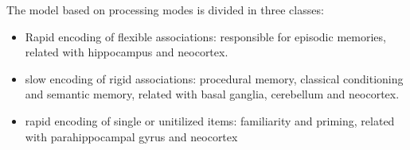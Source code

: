 \documentclass[12pt,article,oneside,a4paper]{memoir}
\begin{document}
\begin{enumerate}
The model based on processing modes is divided in three classes:
\begin{itemize}
\item Rapid encoding of flexible associations: responsible for episodic
memories, related with hippocampus and neocortex.
\item slow encoding of rigid associations: procedural memory, classical
conditioning and semantic memory, related with basal ganglia, cerebellum and
neocortex.
\item rapid encoding of single or unitilized items: familiarity and priming,
related with parahippocampal gyrus and neocortex
\end{itemize}

\end{enumerate}

\end{document}
